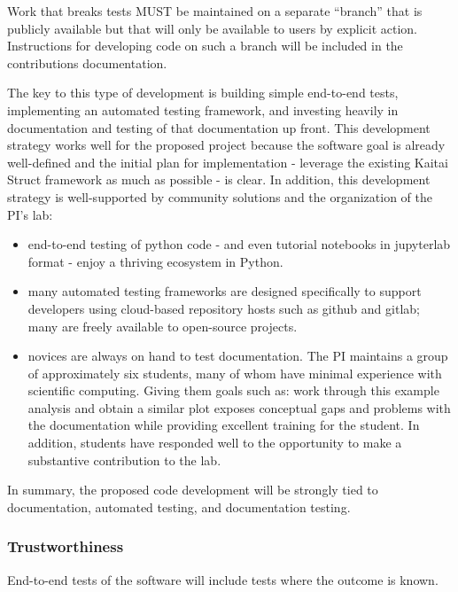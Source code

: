 Work that breaks tests MUST be maintained on a separate ``branch'' that is publicly available but that will only be available to users by explicit action.  Instructions for developing code on such a branch will be included in the contributions documentation.

The key to this type of development is building simple end-to-end tests, implementing an automated testing framework, and investing heavily in documentation and testing of that documentation up front.  This development strategy works well for the proposed project because the software goal is already well-defined and the initial plan for implementation - leverage the existing Kaitai Struct framework as much as possible - is clear.  In addition, this development strategy is well-supported by community solutions and the organization of the PI's lab:

\begin{itemize}
    \item end-to-end testing of python code - and even tutorial notebooks in jupyterlab format - enjoy a thriving ecosystem in Python.
    \item many automated testing frameworks are designed specifically to support developers using cloud-based repository hosts such as github and gitlab; many are freely available to open-source projects.
    \item novices are always on hand to test documentation.  The PI maintains a group of approximately six students, many of whom have minimal experience with scientific computing.  Giving them goals such as: work through this example analysis and obtain a similar plot exposes conceptual gaps and problems with the documentation while providing excellent training for the student.  In addition, students have responded well to the opportunity to make a substantive contribution to the lab.
\end{itemize}

In summary, the proposed code development will be strongly tied to documentation, automated testing, and documentation testing.


\subsubsection{Trustworthiness}
End-to-end tests of the software will include tests where the outcome is known.

